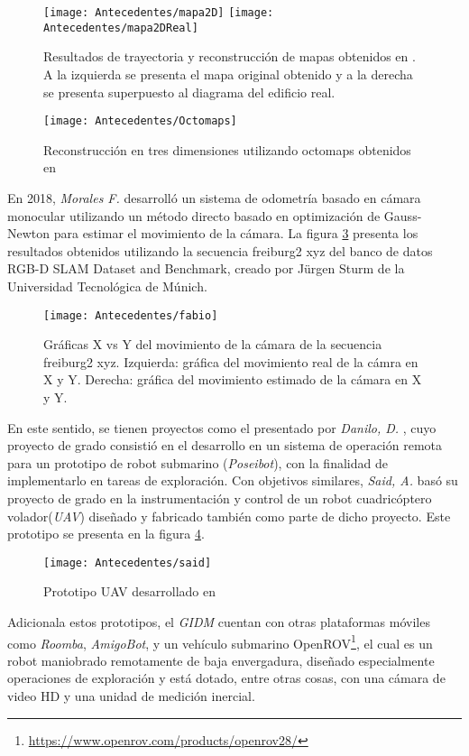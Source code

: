 \begin{figure}[H]
	\centering
	\texttt{[image: Antecedentes/mapa2D]}
	\texttt{[image: Antecedentes/mapa2DReal]}
	\caption{Resultados de trayectoria y reconstrucción de mapas obtenidos en \cite{manuel}. A la izquierda se presenta el mapa original obtenido y a la derecha se presenta superpuesto al diagrama del edificio real.}
	\label{imagen:Antecedentes/mapa2D}
\end{figure}


\begin{figure}[H]
	\centering
	\texttt{[image: Antecedentes/Octomaps]}
	\caption{Reconstrucción en tres dimensiones utilizando octomaps obtenidos
		en  \cite{manuel}}
	\label{imagen:Antecedentes/octomaps}
\end{figure}

En 2018,  \textit{Morales F.} \cite{fabio} desarrolló un sistema de odometría basado en cámara monocular utilizando un método directo basado en optimización de Gauss-Newton para estimar el movimiento de la cámara. La figura \ref{imagen:Antecedentes/fabio} presenta los resultados obtenidos utilizando la secuencia freiburg2 xyz del banco de datos RGB-D SLAM Dataset and Benchmark, creado por Jürgen
Sturm de la Universidad Tecnológica de Múnich.

\begin{figure}[H]
	\centering
	\texttt{[image: Antecedentes/fabio]}
	\caption{Gráficas X vs Y del movimiento de la cámara de la secuencia
		freiburg2 xyz. Izquierda: gráfica del movimiento real de la cámra en X y Y.
		Derecha: gráfica del movimiento estimado de la cámara en X y Y.}
	\label{imagen:Antecedentes/fabio}
\end{figure}

 En este sentido, se tienen proyectos como el presentado por \textit{Danilo, D.} \cite{danilo}, cuyo proyecto de grado consistió en el desarrollo en un sistema de operación remota para un prototipo de robot submarino (\textit{Poseibot}), con la finalidad de implementarlo en tareas de exploración. Con objetivos similares, \textit{Said, A.} \cite{said} basó su proyecto de grado en la instrumentación y control de un robot cuadricóptero volador(\textit{UAV}) diseñado y fabricado también como parte de dicho proyecto. Este prototipo se presenta en la figura \ref{imagen:said}.
\begin{figure}[H]
	\centering
	\texttt{[image: Antecedentes/said]}
	\caption{Prototipo UAV desarrollado en  \cite{said}}
	\label{imagen:said}
\end{figure}
Adicionala estos prototipos,  el \textit{GIDM} cuentan con otras plataformas móviles como \textit{Roomba}, \textit{AmigoBot}, y un vehículo submarino OpenROV\footnote{ \url{https://www.openrov.com/products/openrov28/}}, el cual es un robot maniobrado remotamente de baja envergadura, diseñado especialmente operaciones de exploración y está dotado, entre otras cosas, con una cámara de video HD y una unidad de medición inercial.

